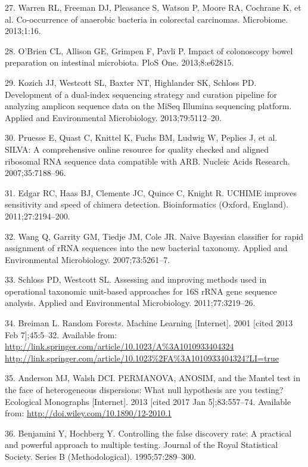 \documentclass[12pt,]{article}
\begin{document}
\hypertarget{ref-warren_co-occurrence_2013}{}
27. Warren RL, Freeman DJ, Pleasance S, Watson P, Moore RA, Cochrane K,
et al. Co-occurrence of anaerobic bacteria in colorectal carcinomas.
Microbiome. 2013;1:16.

\hypertarget{ref-obrien_impact_2013}{}
28. O'Brien CL, Allison GE, Grimpen F, Pavli P. Impact of colonoscopy
bowel preparation on intestinal microbiota. PloS One. 2013;8:e62815.

\hypertarget{ref-kozich_development_2013}{}
29. Kozich JJ, Westcott SL, Baxter NT, Highlander SK, Schloss PD.
Development of a dual-index sequencing strategy and curation pipeline
for analyzing amplicon sequence data on the MiSeq Illumina sequencing
platform. Applied and Environmental Microbiology. 2013;79:5112--20.

\hypertarget{ref-pruesse_silva_2007}{}
30. Pruesse E, Quast C, Knittel K, Fuchs BM, Ludwig W, Peplies J, et al.
SILVA: A comprehensive online resource for quality checked and aligned
ribosomal RNA sequence data compatible with ARB. Nucleic Acids Research.
2007;35:7188--96.

\hypertarget{ref-edgar_uchime_2011}{}
31. Edgar RC, Haas BJ, Clemente JC, Quince C, Knight R. UCHIME improves
sensitivity and speed of chimera detection. Bioinformatics (Oxford,
England). 2011;27:2194--200.

\hypertarget{ref-wang_naive_2007}{}
32. Wang Q, Garrity GM, Tiedje JM, Cole JR. Naive Bayesian classifier
for rapid assignment of rRNA sequences into the new bacterial taxonomy.
Applied and Environmental Microbiology. 2007;73:5261--7.

\hypertarget{ref-schloss_assessing_2011}{}
33. Schloss PD, Westcott SL. Assessing and improving methods used in
operational taxonomic unit-based approaches for 16S rRNA gene sequence
analysis. Applied and Environmental Microbiology. 2011;77:3219--26.

\hypertarget{ref-breiman_random_2001}{}
34. Breiman L. Random Forests. Machine Learning {[}Internet{]}. 2001
{[}cited 2013 Feb 7{]};45:5--32. Available from:
\href{http://link.springer.com/article/10.1023/A\%3A1010933404324\%20http://link.springer.com/article/10.1023\%2FA\%3A1010933404324?LI=true}{http://link.springer.com/article/10.1023/A\%3A1010933404324 http://link.springer.com/article/10.1023\%2FA\%3A1010933404324?LI=true}

\hypertarget{ref-anderson_permanova_2013}{}
35. Anderson MJ, Walsh DCI. PERMANOVA, ANOSIM, and the Mantel test in
the face of heterogeneous dispersions: What null hypothesis are you
testing? Ecological Monographs {[}Internet{]}. 2013 {[}cited 2017 Jan
5{]};83:557--74. Available from:
\url{http://doi.wiley.com/10.1890/12-2010.1}

\hypertarget{ref-benjamini_controlling_1995}{}
36. Benjamini Y, Hochberg Y. Controlling the false discovery rate: A
practical and powerful approach to multiple testing. Journal of the
Royal Statistical Society. Series B (Methodological). 1995;57:289--300.
\end{document}
